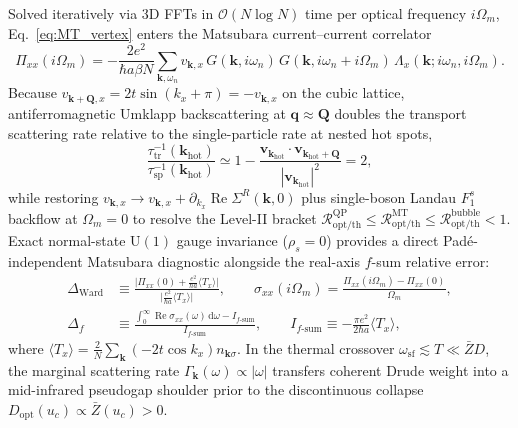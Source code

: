 \documentclass[11pt,a4paper]{article}
\numberwithin{equation}{section}
\theoremstyle{plain}
\theoremstyle{definition}
\providecommand{\vk}{\mathbf{k}}
\providecommand{\vq}{\mathbf{q}}
\providecommand{\vQ}{\mathbf{Q}}
\providecommand{\vv}{\mathbf{v}}
\providecommand{\re}{\operatorname{Re}}
\providecommand{\dd}{\mathrm{d}}
\begin{document}
Solved iteratively via 3D FFTs in $\mathcal{O}(N\log N)$ time per optical frequency
$i\Omega_m$, Eq.~\eqref{eq:MT_vertex} enters the Matsubara current--current correlator
\begin{equation}
    \Pi_{xx}(i\Omega_m)
    = -\frac{2 e^2}{\hbar a \beta N} \sum_{\vk,\omega_n}
      v_{\vk, x}\, G(\vk, i\omega_n)\, G(\vk, i\omega_n + i\Omega_m)\,
      \Lambda_x(\vk; i\omega_n, i\Omega_m).
    \label{eq:Pi_xx}
\end{equation}
Because $v_{\vk+\vQ,x} = 2t\sin(k_x+\pi) = -v_{\vk,x}$ on the cubic lattice,
antiferromagnetic Umklapp backscattering at $\vq \approx \vQ$ doubles the transport
scattering rate relative to the single-particle rate at nested hot spots,
\begin{equation}
    \frac{\tau_{\mathrm{tr}}^{-1}(\vk_{\mathrm{hot}})}{\tau_{\mathrm{sp}}^{-1}(\vk_{\mathrm{hot}})}
    \simeq 1 - \frac{\vv_{\vk_{\mathrm{hot}}}\cdot\vv_{\vk_{\mathrm{hot}}+\vQ}}{|\vv_{\vk_{\mathrm{hot}}}|^2}
    = 2,
    \label{eq:umklapp_doubling}
\end{equation}
while restoring $v_{\vk,x} \to v_{\vk,x} + \partial_{k_x}\re\Sigma^R(\vk,0)$ plus
single-boson Landau $F_1^s$ backflow at $\Omega_m = 0$ to resolve the Level-II bracket
$\mathcal{R}_{\mathrm{opt/th}}^{\mathrm{QP}} \le \mathcal{R}_{\mathrm{opt/th}}^{\mathrm{MT}} \le \mathcal{R}_{\mathrm{opt/th}}^{\mathrm{bubble}} < 1$.
Exact normal-state $\mathrm{U}(1)$ gauge invariance ($\rho_s = 0$) provides a direct
Pad\'e-independent Matsubara diagnostic alongside the real-axis $f$-sum relative error:
\begin{align}
    \Delta_{\mathrm{Ward}}
    &\equiv \frac{\bigl|\Pi_{xx}(0) + \frac{e^2}{\hbar a}\langle T_x \rangle\bigr|}
                 {\bigl|\frac{e^2}{\hbar a}\langle T_x \rangle\bigr|},
    \qquad
    \sigma_{xx}(i\Omega_m) = \frac{\Pi_{xx}(i\Omega_m) - \Pi_{xx}(0)}{\Omega_m},
    \label{eq:Delta_Ward} \\
    \Delta_f
    &\equiv \frac{\int_0^\infty \re\sigma_{xx}(\omega)\,\dd\omega - I_{f\text{-sum}}}{I_{f\text{-sum}}},
    \qquad
    I_{f\text{-sum}} \equiv -\frac{\pi e^2}{2\hbar a}\langle T_x \rangle,
    \label{eq:Delta_f}
\end{align}
where $\langle T_x \rangle = \frac{2}{N}\sum_{\vk}(-2t\cos k_x)n_{\vk\sigma}$. In the
thermal crossover $\omega_{\mathrm{sf}} \lesssim T \ll \bar{Z}D$, the marginal
scattering rate $\Gamma_{\vk}(\omega) \propto |\omega|$ transfers coherent Drude
weight into a mid-infrared pseudogap shoulder prior to the discontinuous collapse
$D_{\mathrm{opt}}(u_c) \propto \bar{Z}(u_c) > 0$.
\end{document}
